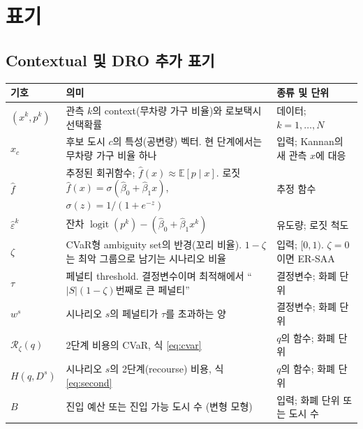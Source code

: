 \documentclass[10pt,a4paper]{article}
\DeclareMathOperator{\logit}{logit}
\begin{document}
\section{표기}
\subsection{Contextual 및 DRO 추가 표기}
{\footnotesize
\begin{longtable}{@{}L{0.14\textwidth}L{0.45\textwidth}L{0.35\textwidth}@{}}
\toprule 기호 & 의미 & 종류 및 단위\\\midrule\endhead\bottomrule\endlastfoot
$(x^k,p^k)$ & 관측 $k$의 context(무차량 가구 비율)와 로보택시 선택확률 & 데이터; $k=1,\dots,N$\\
$x_c$ & 후보 도시 $c$의 특성(공변량) 벡터. 현 단계에서는 무차량 가구 비율 하나 & 입력; Kannan의 새 관측 $x$에 대응\\
$\hat f$ & 추정된 회귀함수; $\hat f(x)\approx\mathbb E[p\mid x]$. 로짓 $\hat f(x)=\sigma(\hat\beta_0+\hat\beta_1x)$, $\sigma(z)=1/(1+e^{-z})$ & 추정 함수\\
$\hat\varepsilon^k$ & 잔차 $\logit(p^k)-(\hat\beta_0+\hat\beta_1x^k)$ & 유도량; 로짓 척도\\
$\zeta$ & CVaR형 ambiguity set의 반경(꼬리 비율). $1-\zeta$는 최악 그룹으로 남기는 시나리오 비율 & 입력; $[0,1)$. $\zeta=0$이면 ER-SAA\\
$\tau$ & 페널티 threshold. 결정변수이며 최적해에서 ``$|S|(1-\zeta)$번째로 큰 페널티'' & 결정변수; 화폐 단위\\
$w^s$ & 시나리오 $s$의 페널티가 $\tau$를 초과하는 양 & 결정변수; 화폐 단위\\
$\mathcal R_\zeta(q)$ & 2단계 비용의 CVaR, 식 \eqref{eq:cvar} & $q$의 함수; 화폐 단위\\
$H(q,D^s)$ & 시나리오 $s$의 2단계(recourse) 비용, 식 \eqref{eq:second} & $q$의 함수; 화폐 단위\\
$B$ & 진입 예산 또는 진입 가능 도시 수 (변형 모형) & 입력; 화폐 단위 또는 도시 수\\
\end{longtable}}
\end{document}
